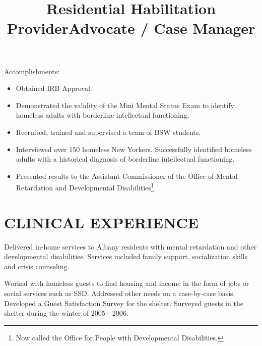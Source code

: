 \documentclass[line, margin, 10pt]{res}
\begin{document}
\begin{resume}
\begin{position}
    Accomplishments:
    \begin{itemize}
    \item Obtained IRB Approval.
    \item Demonstrated the validity of the Mini Mental Status Exam to
      identify homeless adults with borderline intellectual functioning.
    \item Recruited, trained and supervised a team of BSW students.
    \item Interviewed over 150 homeless New Yorkers. Successfully
      identified homeless adults with a historical diagnosis of
      borderline intellectual functioning.
    \item Presented results to the Assistant Commissioner
      of the Office of Mental Retardation and Developmental
      Disabilities\footnote{Now called the Office for People with
        Developmental Disabilities.}.
    \end{itemize}
  \end{position}


  \section{CLINICAL EXPERIENCE}

  \title{Residential Habilitation Provider}
  \begin{position}
    Delivered in-home services to Albany residents with mental
    retardation and other developmental disabilities. Services included
    family support, socialization skills and crisis counseling.
  \end{position}

  \title{Advocate / Case Manager}
  \begin{position}
    Worked with homeless guests to find housing and income in the form
    of jobs or social services such as SSD. Addressed other needs on a case-by-case
    basis. Developed a Guest Satisfaction Survey for the shelter. Surveyed
    guests in the shelter during the winter of 2005 - 2006.
  \end{position}


\end{resume}
\end{document}
